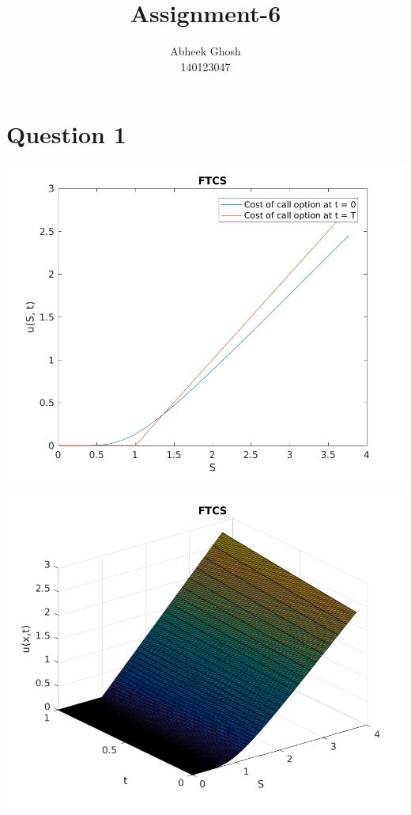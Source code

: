 \documentclass{article}
\begin{document}
	\title{\textbf{Assignment-6}}
	\author{Abheek Ghosh \\ 
		140123047 }
	
	\maketitle

\section{Question 1}

\includegraphics{"q1_1"}
\pagebreak


\includegraphics{"q1_2"}
\pagebreak
\end{document}
